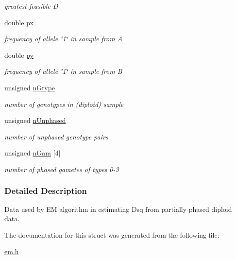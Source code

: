 \begin{DoxyCompactItemize}
\begin{DoxyCompactList}\small\item\em greatest feasible D \end{DoxyCompactList}\item 
\hypertarget{struct_dsq_data_a8bae4af34213c754abcef73f595e3e4a}{double \hyperlink{struct_dsq_data_a8bae4af34213c754abcef73f595e3e4a}{px}}\label{struct_dsq_data_a8bae4af34213c754abcef73f595e3e4a}

\begin{DoxyCompactList}\small\item\em frequency of allele \char`\"{}1\char`\"{} in sample from A \end{DoxyCompactList}\item 
\hypertarget{struct_dsq_data_aa3f221eac7bb1919a62b2f8b5489c3a4}{double \hyperlink{struct_dsq_data_aa3f221eac7bb1919a62b2f8b5489c3a4}{py}}\label{struct_dsq_data_aa3f221eac7bb1919a62b2f8b5489c3a4}

\begin{DoxyCompactList}\small\item\em frequency of allele \char`\"{}1\char`\"{} in sample from B \end{DoxyCompactList}\item 
\hypertarget{struct_dsq_data_ab6f188885c3a13ac49eee9ce9fd84445}{unsigned \hyperlink{struct_dsq_data_ab6f188885c3a13ac49eee9ce9fd84445}{n\+Gtype}}\label{struct_dsq_data_ab6f188885c3a13ac49eee9ce9fd84445}

\begin{DoxyCompactList}\small\item\em number of genotypes in (diploid) sample \end{DoxyCompactList}\item 
\hypertarget{struct_dsq_data_a996906c461f0ce756ae25e72fd889be2}{unsigned \hyperlink{struct_dsq_data_a996906c461f0ce756ae25e72fd889be2}{n\+Unphased}}\label{struct_dsq_data_a996906c461f0ce756ae25e72fd889be2}

\begin{DoxyCompactList}\small\item\em number of unphased genotype pairs \end{DoxyCompactList}\item 
\hypertarget{struct_dsq_data_adcf855e9e80223d33131cb0e2b44c53e}{unsigned \hyperlink{struct_dsq_data_adcf855e9e80223d33131cb0e2b44c53e}{n\+Gam} \mbox{[}4\mbox{]}}\label{struct_dsq_data_adcf855e9e80223d33131cb0e2b44c53e}

\begin{DoxyCompactList}\small\item\em number of phased gametes of types 0-\/3 \end{DoxyCompactList}\end{DoxyCompactItemize}


\subsubsection{Detailed Description}
Data used by E\+M algorithm in estimating Dsq from partially phased diploid data. 

The documentation for this struct was generated from the following file\+:\begin{DoxyCompactItemize}
\item 
\hyperlink{em_8h}{em.\+h}\end{DoxyCompactItemize}
